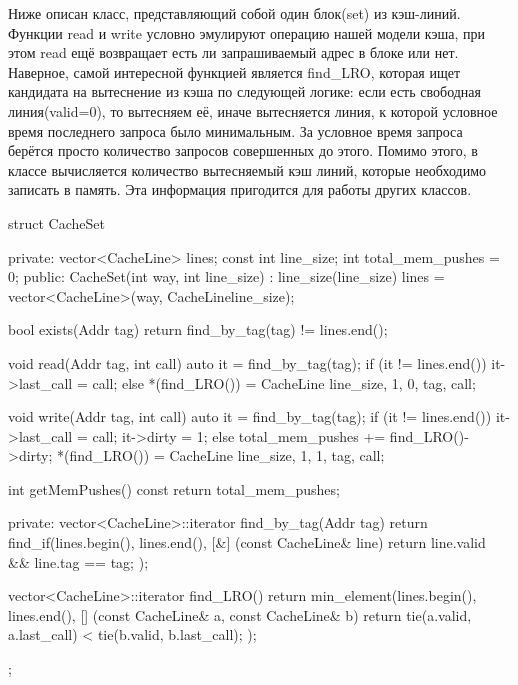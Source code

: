 \documentclass[14pt, russian, onesize]{extreport}
\begin{document}
Ниже описан класс, представляющий собой один блок(set) из кэш-линий.
Функции read и write условно эмулируют операцию нашей модели
кэша, при этом read ещё возвращает есть ли запрашиваемый
адрес в блоке или нет. Наверное, самой интересной функцией
является find\_LRO, которая ищет кандидата на вытеснение из
кэша по следующей логике: если есть свободная линия(valid=0),
то вытесняем её, иначе вытесняется линия, к которой условное время
последнего запроса было минимальным. За условное время запроса
берётся просто количество запросов совершенных до этого.
Помимо этого, в классе вычисляется количество
вытесняемый кэш линий, которые необходимо записать в память.
Эта информация пригодится для работы других классов.
\begin{cppcode}

struct CacheSet {
private:
    vector<CacheLine> lines;
    const int line_size;
    int total_mem_pushes = 0;
public:
    CacheSet(int way, int line_size) : line_size(line_size) {
        lines = vector<CacheLine>(way, CacheLine{line_size});
    }

    bool exists(Addr tag) {
        return find_by_tag(tag) != lines.end();
    } 

    void read(Addr tag, int call) {
        auto it = find_by_tag(tag);
        if (it != lines.end()) {
            it->last_call = call;
        } else {
            *(find_LRO()) = CacheLine {line_size, 1, 0, tag, call};
        }
    }

    void write(Addr tag, int call) {
        auto it = find_by_tag(tag);
        if (it != lines.end()) {
            it->last_call = call;
            it->dirty = 1;
        } else {
            total_mem_pushes += find_LRO()->dirty;
            *(find_LRO()) = CacheLine {line_size, 1, 1, tag, call};
        }
    }

    int getMemPushes() const {
        return total_mem_pushes;
    }

private:
    vector<CacheLine>::iterator find_by_tag(Addr tag) {
        return find_if(lines.begin(), lines.end(), [&] (const CacheLine& line) {
                return line.valid && line.tag == tag;
            }
        );
    }

    vector<CacheLine>::iterator find_LRO() {
        return min_element(lines.begin(), lines.end(), [] (const CacheLine& a, const CacheLine& b) {
            return tie(a.valid, a.last_call) < tie(b.valid, b.last_call);
        });
    }
};

\end{cppcode}
\end{document}
